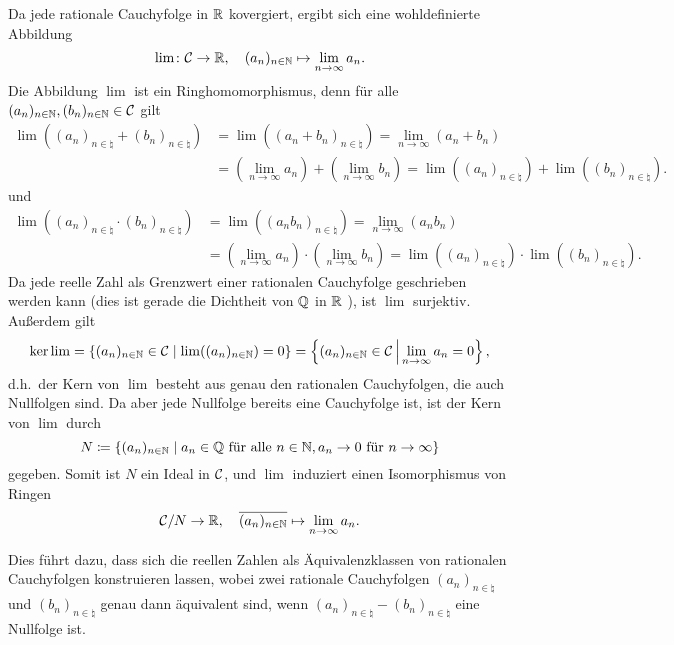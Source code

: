 \begin{example}
\begin{enumerate}
      Da jede rationale Cauchyfolge in $\mathbb{R}$ kovergiert, ergibt sich eine wohldefinierte Abbildung
      \[
                \lim
        \colon  \mathcal{C}
        \to     \mathbb{R},
        \quad   (a_n)_{n \in \mathbb{N}}
        \mapsto \lim_{n \to \infty} a_n.
      \]
      Die Abbildung $\lim$ ist ein Ringhomomorphismus, denn für alle $(a_n)_{n \in \mathbb{N}}, (b_n)_{n \in \mathbb{N}} \in \mathcal{C}$ gilt
      \begin{align*}
            \lim( (a_n)_{n \in \natural} + (b_n)_{n \in \natural} )
        &=  \lim( (a_n + b_n)_{n \in \natural} )
          =  \lim_{n \to \infty} (a_n + b_n)
        \\
        &=  \left( \lim_{n \to \infty} a_n \right) + \left( \lim_{n \to \infty} b_n \right)
          =  \lim( (a_n)_{n \in \natural} ) + \lim( (b_n)_{n \in \natural} ).
      \end{align*}
      und
      \begin{align*}
            \lim( (a_n)_{n \in \natural} \cdot (b_n)_{n \in \natural} )
        &=  \lim( (a_n b_n)_{n \in \natural} )
        =  \lim_{n \to \infty} (a_n b_n)
        \\
        &=  \left( \lim_{n \to \infty} a_n \right) \cdot \left( \lim_{n \to \infty} b_n \right)
        =  \lim( (a_n)_{n \in \natural} ) \cdot \lim( (b_n)_{n \in \natural} ).
      \end{align*}
      Da jede reelle Zahl als Grenzwert einer rationalen Cauchyfolge geschrieben werden kann (dies ist gerade die Dichtheit von $\mathbb{Q}$ in $\mathbb{R}$ ), ist $\lim$ surjektiv.
      Außerdem gilt
      \[
          \ker \lim
        = \{ (a_n)_{n \in \mathbb{N}} \in \mathcal{C} \mid \lim( (a_n)_{n \in \mathbb{N}} ) = 0 \}
        = \left\{
            (a_n)_{n \in \mathbb{N}} \in \mathcal{C}
          \,\middle|\,
            \lim_{n \to \infty} a_n = 0
          \right\},
      \]
      d.h.\ der Kern von $\lim$ besteht aus genau den rationalen Cauchyfolgen, die auch Nullfolgen sind.
      Da aber jede Nullfolge bereits eine Cauchyfolge ist, ist der Kern von $\lim$ durch
      \[
                  N
        \coloneqq \{
                    (a_n)_{n \in \mathbb{N}}
                  \mid
                    \text{$a_n \in \mathbb{Q}$ für alle $n \in \mathbb{N}$},
                    \text{$a_n \to 0$ für $n \to \infty$}
                  \}
      \]
      gegeben.
      Somit ist $N$ ein Ideal in $\mathcal{C}$, und $\lim$ induziert einen Isomorphismus von Ringen
      \[
                \mathcal{C}/N
        \to     \mathbb{R},
        \quad   \overline{ (a_n)_{n \in \mathbb{N}} }
        \mapsto \lim_{n \to \infty} a_n.
      \]
      
      Dies führt dazu, dass sich die reellen Zahlen als Äquivalenzklassen von rationalen Cauchyfolgen konstruieren lassen, wobei zwei rationale Cauchyfolgen $(a_n)_{n \in \natural}$ und $(b_n)_{n \in \natural}$ genau dann äquivalent sind, wenn $(a_n)_{n \in \natural} - (b_n)_{n \in \natural}$ eine Nullfolge ist.
  \end{enumerate}
\end{example}









